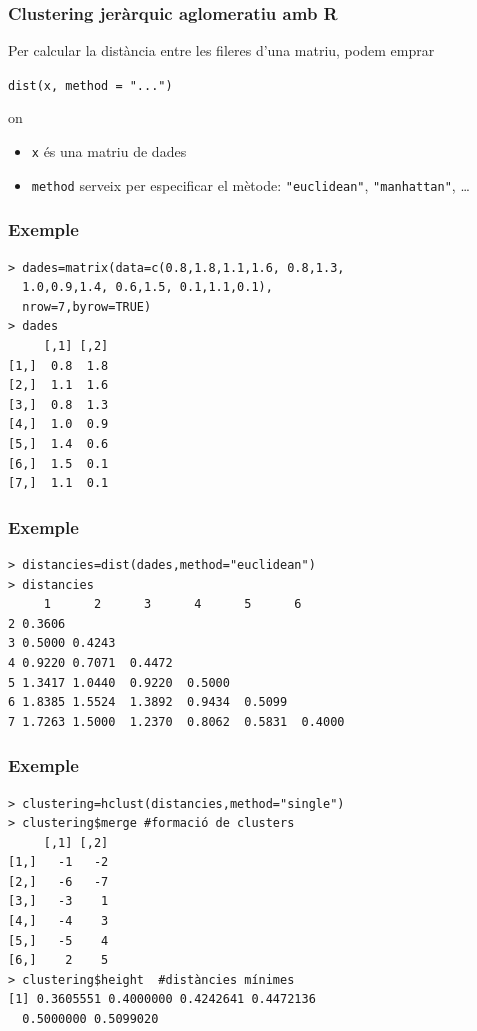 \documentclass[12pt,t]{beamer}
\theoremstyle{plain}
\theoremstyle{definition}
\begin{document}
\begin{frame}[fragile]
\frametitle{Clustering jeràrquic aglomeratiu amb R}


Per calcular la distància entre les fileres d'una matriu, podem emprar
\begin{center}
\verb?dist(x, method = "...")?
\end{center}
on
\begin{itemize}
\item \texttt{x} és una matriu de dades
\medskip

\item \texttt{method} serveix per especificar el mètode:   \verb?"euclidean"?,  \verb?"manhattan"?, \ldots
\end{itemize}
\medskip
\end{frame}



\begin{frame}[fragile]
\frametitle{Exemple}

\begin{verbatim}
> dades=matrix(data=c(0.8,1.8,1.1,1.6, 0.8,1.3,
  1.0,0.9,1.4, 0.6,1.5, 0.1,1.1,0.1), 
  nrow=7,byrow=TRUE)
> dades
     [,1] [,2]
[1,]  0.8  1.8
[2,]  1.1  1.6
[3,]  0.8  1.3
[4,]  1.0  0.9
[5,]  1.4  0.6
[6,]  1.5  0.1
[7,]  1.1  0.1
\end{verbatim}


\end{frame}

\begin{frame}[fragile]
\frametitle{Exemple}

\begin{verbatim}
> distancies=dist(dades,method="euclidean")
> distancies
     1      2      3      4      5      6
2 0.3606                                                  
3 0.5000 0.4243                                        
4 0.9220 0.7071  0.4472                             
5 1.3417 1.0440  0.9220  0.5000                  
6 1.8385 1.5524  1.3892  0.9434  0.5099           
7 1.7263 1.5000  1.2370  0.8062  0.5831  0.4000 
\end{verbatim}
\end{frame}

\begin{frame}[fragile]
\frametitle{Exemple}

\begin{verbatim}
> clustering=hclust(distancies,method="single")
> clustering$merge #formació de clusters
     [,1] [,2]
[1,]   -1   -2
[2,]   -6   -7
[3,]   -3    1
[4,]   -4    3
[5,]   -5    4
[6,]    2    5
> clustering$height  #distàncies mínimes
[1] 0.3605551 0.4000000 0.4242641 0.4472136 
  0.5000000 0.5099020
\end{verbatim}





\end{frame}
\end{document}
